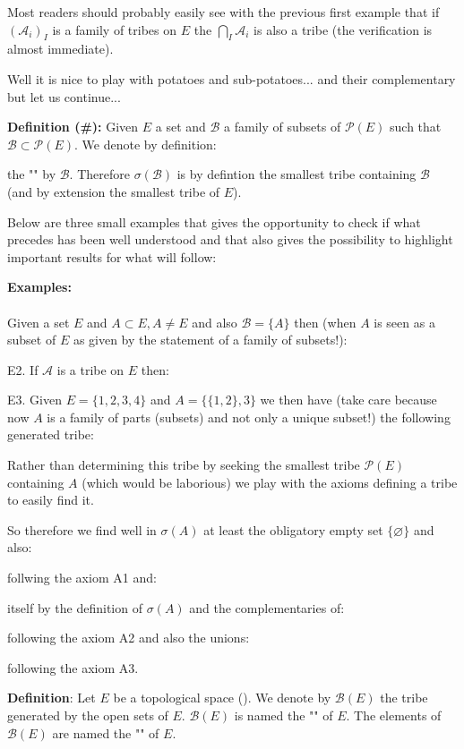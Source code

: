 	\begin{tcolorbox}[title=Remark,colframe=black,arc=10pt]
	Most readers should probably easily see with the previous first example that if $(\mathcal{A}_i)_I$ is a family of tribes on $E$ the $\bigcap_I \mathcal{A}_i$ is also a tribe (the verification is almost immediate).
	\end{tcolorbox}	
	Well it is nice to play with potatoes and sub-potatoes... and their complementary but let us continue...
	
	\textbf{Definition (\#\mydef):} Given $E$ a set and $\mathcal{B}$ a family of subsets of $\mathcal{P}(E)$ such that $\mathcal{B}\subset \mathcal{P}(E)$. We denote by definition:
	
	the "" by $\mathcal{B}$. Therefore $\sigma(\mathcal{B})$ is by defintion the smallest tribe containing $\mathcal{B}$ (and by extension the smallest tribe of $E$).

	Below are three small examples that gives the opportunity to check if what precedes has been well understood and that also gives the possibility to highlight important results for what will follow:
	\begin{tcolorbox}[colframe=black,colback=white,sharp corners]
	\textbf{{\Large {}}Examples:}\\\\
	Given a set $E$ and $A\subset E,A \neq E$ and also $\mathcal{B}=\{A\}$ then (when $A$ is seen as a subset of $E$ as given by the statement of a family of subsets!):
	
	
	E2. If $\mathcal{A}$ is a tribe on $E$ then:
	

	E3. Given $E=\{1,2,3,4\}$ and $A=\{\{1,2\},{3}\}$ we then have (take care because now $A$ is a family of parts (subsets) and not only a unique subset!) the following generated tribe:
	
	Rather than determining this tribe by seeking the smallest tribe $\mathcal{P}(E)$ containing $A$ (which would be laborious) we play with the axioms defining a tribe to easily find it.
	
	So therefore we find well in $\sigma(A)$ at least the obligatory empty set $\{\varnothing\}$ and also:
	
	follwing the axiom A1 and:
	
	itself by the definition of $\sigma(A)$ and the complementaries of:
	
	following the axiom A2 and also the unions:
	
	following the axiom A3.
	\end{tcolorbox}
	\textbf{Definition}: Let $E$ be a topological space (). We denote by $\mathcal{B}(E)$ the tribe generated by the open sets of $E$. $\mathcal{B}(E)$ is named the "" of $E$. The elements of $\mathcal{B}(E)$ are named the "" of $E$. 
	
